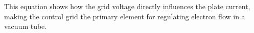 This equation shows how the grid voltage directly influences the plate current, making the control grid the primary element for regulating electron flow in a vacuum tube.

